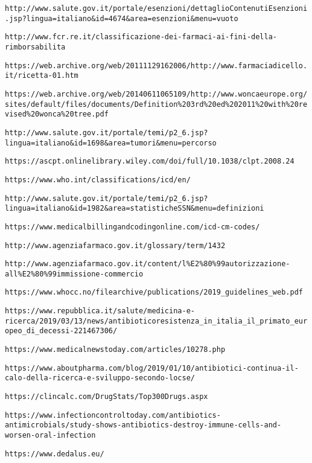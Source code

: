 \begin{thebibliography}{}
	\texttt{http://www.salute.gov.it/portale/esenzioni/dettaglioContenutiEsenzioni.jsp?lingua=italiano\&id=4674\&area=esenzioni\&menu=vuoto}
	
	\texttt{http://www.fcr.re.it/classificazione-dei-farmaci-ai-fini-della-rimborsabilita}
	
	\texttt{https://web.archive.org/web/20111129162006/http://www.farmaciadicello.it/ricetta-01.htm}
	
	\texttt{https://web.archive.org/web/20140611065109/http://www.woncaeurope.org/sites/default/files/documents/Definition\%203rd\%20ed\%202011\%20with\%20revised\%20wonca\%20tree.pdf}
	
	\texttt{http://www.salute.gov.it/portale/temi/p2\_6.jsp?lingua=italiano\&id=1698\&area=tumori\&menu=percorso}
	
	\texttt{https://ascpt.onlinelibrary.wiley.com/doi/full/10.1038/clpt.2008.24}
	
	\texttt{https://www.who.int/classifications/icd/en/}
	
	\texttt{http://www.salute.gov.it/portale/temi/p2\_6.jsp?lingua=italiano\&id=1982\&area=statisticheSSN\&menu=definizioni}
	
	\texttt{https://www.medicalbillingandcodingonline.com/icd-cm-codes/}
	
	\texttt{http://www.agenziafarmaco.gov.it/glossary/term/1432}
	
	\texttt{http://www.agenziafarmaco.gov.it/content/l\%E2\%80\%99autorizzazione-all\%E2\%80\%99immissione-commercio}
	
	\texttt{https://www.whocc.no/filearchive/publications/2019\_guidelines\_web.pdf}
	
	\texttt{https://www.repubblica.it/salute/medicina-e-ricerca/2019/03/13/news/antibioticoresistenza\_in\_italia\_il\_primato\_europeo\_di\_decessi-221467306/}
	
	\texttt{https://www.medicalnewstoday.com/articles/10278.php}
	
	\texttt{https://www.aboutpharma.com/blog/2019/01/10/antibiotici-continua-il-calo-della-ricerca-e-sviluppo-secondo-locse/}
	
	\texttt{https://clincalc.com/DrugStats/Top300Drugs.aspx}
	
	\texttt{https://www.infectioncontroltoday.com/antibiotics-antimicrobials/study-shows-antibiotics-destroy-immune-cells-and-worsen-oral-infection}
	
	\texttt{https://www.dedalus.eu/}
	
\end{thebibliography}
	